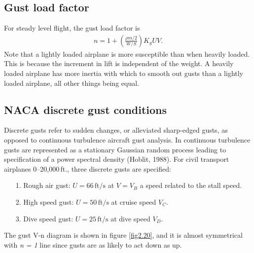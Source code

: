 \documentclass{AeroStructure-ERJohnson}
\begin{document}


\subsection{Gust load factor}\label{sec2.5.2}

For steady level flight, the gust load factor is
\begin{align}\label{eq2.52}
\boxed{n=1+\left(\frac{\rho m/2}{W/S}\right) K_{g} U V.}
\end{align}
Note that a lightly loaded airplane is more susceptible than when heavily loaded. This is because the increment in lift is independent of the weight. A heavily loaded airplane has more inertia with which to smooth out gusts than a lightly loaded airplane, all other things being equal.

\subsection{NACA discrete gust conditions}\label{sec2.5.3}

Discrete gusts refer to sudden changes, or alleviated sharp-edged gusts, as opposed to continuous turbulence aircraft gust analysis. In continuous turbulence gusts are represented as a stationary Gaussian random process leading to specification of a power spectral density (Hoblit, 1988). For civil transport airplanes 0--20,000\,ft., three discrete gusts are specified:
\begin{enumerate}
\item[1.] Rough air gust: $U=66\,\mathrm{ft}/\mathrm{s}$ at $V=V_{B}$ a speed related to the stall speed.
\item[2.] High speed gust: $U=50\,\mathrm{ft}/\mathrm{s}$ at cruise speed $V_{C}$.
\item[3.] Dive speed gust: $U=25\,\mathrm{ft}/\mathrm{s}$ at dive speed $V_{D}$.
\end{enumerate}

The gust V-n diagram is shown in figure \ref{fig2.20}, and it is almost symmetrical with \textit{n = 1} line since gusts are as likely to act down as up.

{\def\thefigure{2.20}
}
\end{document}

